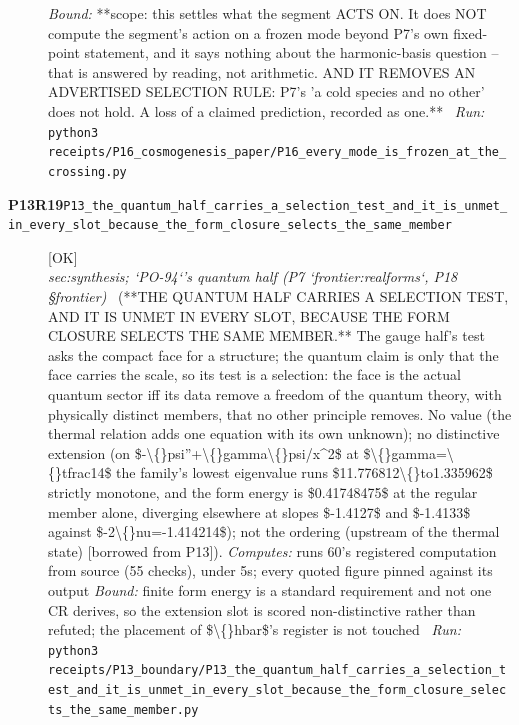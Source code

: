 \begin{description}
 \emph{Bound:} **scope: this settles what the segment ACTS ON. It does NOT compute the segment's action on a frozen mode beyond P7's own fixed-point statement, and it says nothing about the harmonic-basis question -- that is answered by reading, not arithmetic. AND IT REMOVES AN ADVERTISED SELECTION RULE: P7's 'a cold species and no other' does not hold. A loss of a claimed prediction, recorded as one.**
\ \emph{Run:} \texttt{python3 receipts/P16\_cosmogenesis\_paper/P16\_every\_mode\_is\_frozen\_at\_the\_crossing.py}
\item[\rcptlabel{P13_the_quantum_half_carries_a_selection_test_and_it_is_unmet_in_every_slot_because_the_form_closure_selects_the_same_member}{P13R19}\textbf{P13R19}\quad\texttt{P13\_the\_quantum\_half\_carries\_a\_selection\_test\_and\_it\_is\_unmet\_in\_every\_slot\_because\_the\_form\_closure\_selects\_the\_same\_member}]\hfill\textsf{[OK]}\\
\textit{sec:synthesis; `PO-94`'s quantum half (P7 `frontier:realforms`, P18 \S{}frontier)} \ (**THE QUANTUM HALF CARRIES A SELECTION TEST, AND IT IS UNMET IN EVERY SLOT, BECAUSE THE FORM CLOSURE SELECTS THE SAME MEMBER.** The gauge half's test asks the compact face for a structure; the quantum claim is only that the face carries the scale, so its test is a selection: the face is the actual quantum sector iff its data remove a freedom of the quantum theory, with physically distinct members, that no other principle removes. No value (the thermal relation adds one equation with its own unknown); no distinctive extension (on \$-\textbackslash\{\}psi''+\textbackslash\{\}gamma\textbackslash\{\}psi/x\textasciicircum{}2\$ at \$\textbackslash\{\}gamma=\textbackslash\{\}tfrac14\$ the family's lowest eigenvalue runs \$11.776812\textbackslash\{\}to1.335962\$ strictly monotone, and the form energy is \$0.41748475\$ at the regular member alone, diverging elsewhere at slopes \$-1.4127\$ and \$-1.4133\$ against \$-2\textbackslash\{\}nu=-1.414214\$); not the ordering (upstream of the thermal state) [borrowed from P13]). 
\emph{Computes:} runs 60's registered computation from source (55 checks), under 5s; every quoted figure pinned against its output
 \emph{Bound:} finite form energy is a standard requirement and not one CR derives, so the extension slot is scored non-distinctive rather than refuted; the placement of \$\textbackslash\{\}hbar\$'s register is not touched
\ \emph{Run:} \texttt{python3 receipts/P13\_boundary/P13\_the\_quantum\_half\_carries\_a\_selection\_test\_and\_it\_is\_unmet\_in\_every\_slot\_because\_the\_form\_closure\_selects\_the\_same\_member.py}

\end{description}
